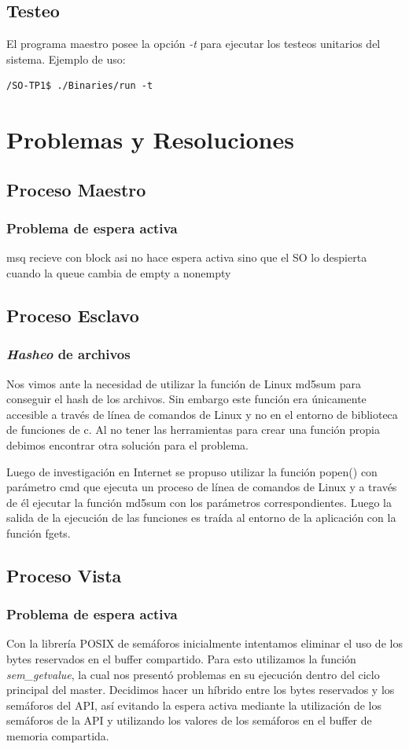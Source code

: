 \documentclass[10pt,a4paper]{report}
\begin{document}
\section{Testeo}
El programa maestro posee la opción \textit{-t} para ejecutar los testeos unitarios del sistema. Ejemplo de uso:
\begin{lstlisting}
/SO-TP1$ ./Binaries/run -t
\end{lstlisting}

\chapter{Problemas y Resoluciones}
\section{Proceso Maestro}
\subsection{Problema de espera activa}
msq recieve con block asi no hace espera activa sino que el SO lo despierta cuando la queue cambia de empty a nonempty
\section{Proceso Esclavo}
\subsection{\textit{Hasheo} de archivos}
Nos vimos ante la necesidad de utilizar la función de Linux md5sum para conseguir el hash de los archivos. Sin embargo este función
era únicamente accesible a través de línea de comandos de Linux y no en el entorno de biblioteca de funciones de c. Al no tener las
herramientas para crear una función propia debimos encontrar otra solución para el problema.

Luego de investigación en Internet se propuso utilizar la función popen() con parámetro cmd que ejecuta un proceso de línea de comandos
de Linux y a través de él ejecutar la función md5sum con los parámetros correspondientes. Luego la salida de la ejecución de las funciones
es traída al entorno de la aplicación con la función fgets.
\section{Proceso Vista}
\subsection{Problema de espera activa}
	Con la librería POSIX de semáforos inicialmente intentamos eliminar el uso de los bytes reservados en el buffer compartido. Para esto utilizamos la función \textit{sem\_getvalue}, la cual nos presentó problemas en su ejecución dentro del ciclo principal del master. Decidimos hacer un híbrido entre los bytes reservados y los semáforos del API, así evitando la espera activa mediante la utilización de los semáforos de la API y utilizando los valores de los semáforos en el buffer de memoria compartida.
\end{document}
